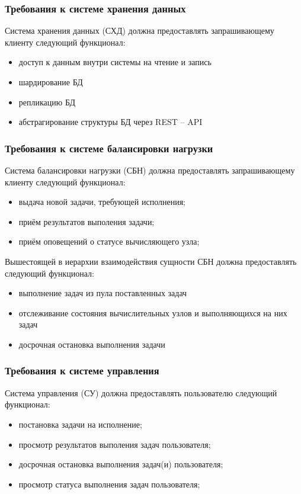 \documentclass[a4paper,12pt]{report}
\numberwithin{equation}{section}
\begin{document}
\subsubsection{Требования к системе хранения данных}
Система хранения данных (СХД) должна предоставлять запрашивающему клиенту следующий функционал:
\begin{itemize}
  \item доступ к данным внутри системы на чтение и запись
  \item шардирование БД
  \item репликацию БД
  \item абстрагирование структуры БД через REST -- API
\end{itemize}

\subsubsection{Требования к системе балансировки нагрузки}
Система балансировки нагрузки (СБН) должна предоставлять запрашивающему клиенту следующий функционал:
\begin{itemize}
  \item выдача новой задачи, требующей исполнения;
  \item приём результатов выполения задачи;
  \item приём оповещений о статусе вычисляющего узла;
\end{itemize}

Вышестоящей в иерархии взаимодействия сущности СБН должна предоставлять следующий функционал:
\begin{itemize}
  \item выполнение задач из пула поставленных задач
  \item отслеживание состояния вычислительных узлов и выполняющихся на них задач
  \item досрочная остановка выполнения задачи
\end{itemize}

\subsubsection{Требования к системе управления}
Система управления (СУ) должна предоставлять пользователю следующий функционал:
\begin{itemize}
  \item постановка задачи на исполнение;
  \item просмотр результатов выполения задач пользователя;
  \item досрочная остановка выполнения задач(и) пользователя;
  \item просмотр статуса выполнения задач пользователя;
\end{itemize}
\end{document}
